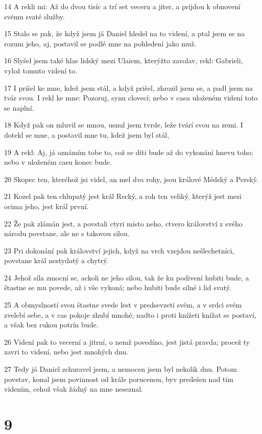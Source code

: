 \par 14 A rekli mi: Až do dvou tisíc a trí set veceru a jiter, a prijdou k obnovení svému svaté služby.
\par 15 Stalo se pak, že když jsem já Daniel hledel na to videní, a ptal jsem se na rozum jeho, aj, postavil se podlé mne na pohledení jako muž.
\par 16 Slyšel jsem také hlas lidský mezi Ulaiem, kterýžto zavolav, rekl: Gabrieli, vylož tomuto videní to.
\par 17 I prišel ke mne, kdež jsem stál, a když prišel, zhrozil jsem se, a padl jsem na tvár svou. I rekl ke mne: Pozoruj, synu clovecí; nebo v casu uloženém videní toto se naplní.
\par 18 Když pak on mluvil se mnou, usnul jsem tvrde, leže tvárí svou na zemi. I dotekl se mne, a postavil mne tu, kdež jsem byl stál,
\par 19 A rekl: Aj, já oznámím tobe to, což se díti bude až do vykonání hnevu toho; nebo v uloženém casu konec bude.
\par 20 Skopec ten, kteréhož jsi videl, an mel dva rohy, jsou králové Médský a Perský.
\par 21 Kozel pak ten chlupatý jest král Recký, a roh ten veliký, kterýž jest mezi ocima jeho, jest král první.
\par 22 Že pak zlámán jest, a povstali ctyri místo neho, ctvero království z svého národu povstane, ale ne s takovou silou.
\par 23 Pri dokonání pak království jejich, když na vrch vzejdou nešlechetníci, povstane král nestydatý a chytrý.
\par 24 Jehož síla zmocní se, ackoli ne jeho silou, tak že ku podivení hubiti bude, a štastne se mu povede, až i vše vykoná; nebo hubiti bude silné i lid svatý.
\par 25 A obmyslností svou štastne svede lest v predsevzetí svém, a v srdci svém zvelebí sebe, a v cas pokoje zhubí mnohé; nadto i proti knížeti knížat se postaví, a však bez rukou potrín bude.
\par 26 Videní pak to vecerní a jitrní, o nemž povedíno, jest jistá pravda; procež ty zavri to videní, nebo jest mnohých dnu.
\par 27 Tedy já Daniel zchuravel jsem, a nemocen jsem byl nekolik dnu. Potom povstav, konal jsem povinnost od krále porucenou, byv predešen nad tím videním, cehož však žádný na mne neseznal.

\chapter{9}

